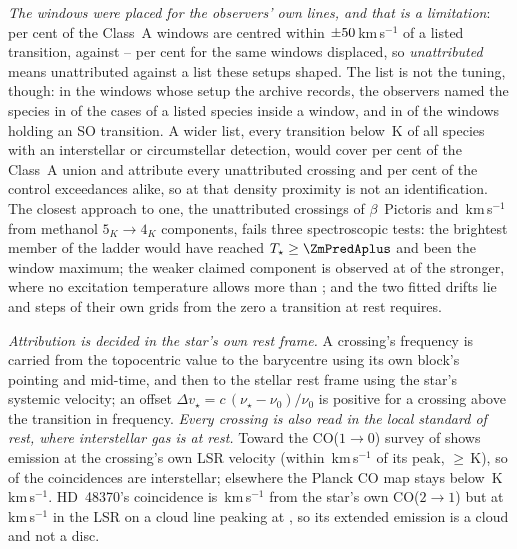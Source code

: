 \emph{The windows were placed for the observers' own lines, and that is a
limitation}: \TnCenPct{} per cent of the \NWinA{} Class~A windows are centred
within $\pm50$\,km\,s$^{-1}$ of a listed transition, against
\TnCtrlCenLo--\TnCtrlCenHi{} per cent for the same windows displaced, so
\emph{unattributed} means unattributed against a list these setups shaped.
The list is not the tuning, though: in the \TuNWinSetup{} windows whose setup
the archive records, the observers named the species in \TuNPairTuned{} of
the \TuNPair{} cases of a listed species inside a window, and in
\TuNSOTuned{} of the \TuNSOWin{} windows holding an SO transition. A wider
list, every transition below \XlEuMax\,K of all \XlNSpecies{} species with an
interstellar or circumstellar detection, would cover \XlBandPct{} per cent of
the Class~A union and attribute every unattributed crossing and
\XlShareWidePct{} per cent of the control exceedances alike, so at that
density proximity is not an identification. The closest approach to one, the
\ZmNCross{} unattributed crossings of $\beta$~Pictoris \ZmDvLo{} and
\ZmDvHi\,km\,s$^{-1}$ from methanol $5_K\to4_K$ components, fails three
spectroscopic tests: the brightest member of the ladder would have reached
$T_\star\ge\ZmPredAplus$ and been the window maximum; the weaker claimed
component is observed at \ZmRatioObs{} of the stronger, where no excitation
temperature allows more than \ZmRatioMax; and the two fitted drifts lie
\ZmStepsOne{} and \ZmStepsTwo{} steps of their own grids from the zero a
transition at rest requires.

\emph{Attribution is decided in the star's own rest frame.} A crossing's
frequency is carried from the topocentric value to the barycentre using its
own block's pointing and mid-time, and then to the stellar rest frame using
the star's systemic velocity; an offset $\Delta v_\star =
c\,(\nu_\star-\nu_0)/\nu_0$ is positive for a crossing above the transition
in frequency. \emph{Every crossing is also read in the local standard of rest,
where interstellar gas is at rest.} Toward \LsCloudStars{} the CO($1\to0$)
survey of \citet{DameThaddeus2022,Dame2001} shows emission at the crossing's
own LSR velocity (within \LsCloudDvMax\,km\,s$^{-1}$ of its peak,
$\ge$\LsCloudTMin\,K), so \LsNCloud{} of the \MkNCoinc{} coincidences are
interstellar; elsewhere the Planck CO map \citep{PlanckCO2016} stays below
\LsPlanckMax\,K\,km\,s$^{-1}$. HD~48370's coincidence is
\LsHdDvStar\,km\,s$^{-1}$ from the star's own CO($2\to1$) but at
\LsHdVfeat\,km\,s$^{-1}$ in the LSR on a cloud line peaking at \LsHdVco, so
its extended emission is a cloud and not a disc.

